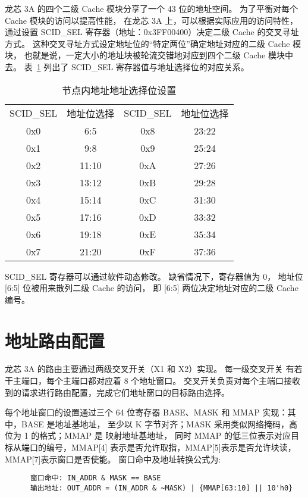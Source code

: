 龙芯 3A 的四个二级 Cache 模块分享了一个 43 位的地址空间。
为了平衡对每个 Cache 模块的访问以提高性能， 在龙芯 3A 上，可以根据实际应用的访问特性，
通过设置 SCID\_SEL 寄存器（地址：0x3FF00400）决定二级 Cache
的交叉寻址方式。
这种交叉寻址方式设定地址位的``特定两位''确定地址对应的二级 Cache 模块，
也就是说，一定大小的地址块被轮流交错地对应到四个二级 Cache 模块中去。
表~\ref{tab:scidsel} 列出了 SCID\_SEL 寄存器值与地址选择位的对应关系。
\begin{table}[htbp]
  \centering
  \begin{tabular}{|c|c||c|c|} \hline
    SCID\_SEL & 地址位选择 & SCID\_SEL & 地址位选择 \\ \hhline
    0x0       & 6:5        & 0x8       & 23:22      \\ \hline
    0x1       & 9:8        & 0x9       & 25:24      \\ \hline
    0x2       & 11:10      & 0xA       & 27:26      \\ \hline
    0x3       & 13:12      & 0xB       & 29:28      \\ \hline
    0x4       & 15:14      & 0xC       & 31:30      \\ \hline
    0x5       & 17:16      & 0xD       & 33:32      \\ \hline
    0x6       & 19:18      & 0xE       & 35:34      \\ \hline
    0x7       & 21:20      & 0xF       & 37:36      \\ \hline
  \end{tabular}
  \caption{节点内地址地址选择位设置}
  \label{tab:scidsel}
\end{table}

SCID\_SEL 寄存器可以通过软件动态修改。 缺省情况下，寄存器值为 0， 地址位 [6:5]
位被用来散列二级 Cache 的访问， 即 [6:5] 两位决定地址对应的二级 Cache
编号。

\section{地址路由配置} \label{sec:htAddrRoute}

龙芯 3A 的路由主要通过两级交叉开关（X1 和 X2）实现。 每一级交叉开关
有若干主端口，每个主端口都对应着 8 个地址窗口。
交叉开关负责对每个主端口接收到的请求进行路由配置，完成它们地址窗口的目标路由选择。

每个地址窗口的设置通过三个 64 位寄存器 BASE、MASK 和 MMAP 实现：其中，BASE
是地址基地址， 至少以 K 字节对齐；MASK 采用类似网络掩码，高位为 1 的格式；MMAP 是
映射地址基地址， 同时 MMAP 的低三位表示对应目标从端口的编号，MMAP[4]
表示是否允许取指，MMAP[5]表示是否允许块读，MMAP[7]表示窗口是否使能。
窗口命中及地址转换公式为:
\begin{verbatim}
      窗口命中: IN_ADDR & MASK == BASE
      输出地址: OUT_ADDR = (IN_ADDR & ~MASK) | {MMAP[63:10] || 10'h0}
\end{verbatim}

